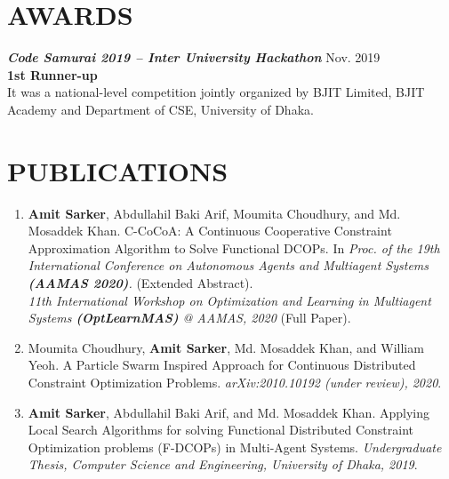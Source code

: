 \documentclass[margin, 10pt]{res} %
\makeatletter
\newlength{\bibhang}
\newlength{\bibsep}
 {\@listi \global\bibsep\itemsep \global\advance\bibsep by\parsep}
\newenvironment{bibsection}%
        {\begin{enumerate}{}{%
       \setlength{\leftmargin}{\bibhang}%
       \setlength{\itemindent}{-\leftmargin}%
       \setlength{\itemsep}{\bibsep}%
       \setlength{\parsep}{\z@}%
        \setlength{\partopsep}{0pt}%
        \setlength{\topsep}{0pt}}}
        {\end{enumerate}\vspace{-.6\baselineskip}}
\makeatother
\begin{document}
\begin{resume}




\section{AWARDS}

{\sl \bf{Code Samurai 2019 -- Inter University Hackathon} } \hfill Nov. 2019 \\ 
\textbf{1st Runner-up} \\
It was a national-level competition jointly organized by BJIT Limited, BJIT Academy and Department of CSE, University of Dhaka.


\section{PUBLICATIONS}
\begin{bibsection}
\item \textbf{Amit Sarker}, Abdullahil Baki Arif, Moumita Choudhury, and Md. Mosaddek Khan. C-CoCoA: A Continuous Cooperative Constraint Approximation Algorithm to Solve Functional DCOPs. In \emph{Proc. of the 19th International Conference on Autonomous Agents and Multiagent Systems \textbf{(AAMAS 2020)}.} (Extended Abstract). \\ 
\emph{11th International Workshop on Optimization and Learning in Multiagent Systems \textbf{(OptLearnMAS)} @ \mbox{AAMAS}, 2020} (Full Paper).

\item Moumita Choudhury, \textbf{Amit Sarker}, Md. Mosaddek Khan, and William Yeoh. A Particle Swarm Inspired Approach for Continuous Distributed Constraint Optimization Problems. \emph{arXiv:2010.10192  (under review), 2020}.

\item \textbf{Amit Sarker}, Abdullahil Baki Arif, and Md. Mosaddek Khan. Applying Local Search Algorithms for solving Functional Distributed Constraint Optimization problems
(F-DCOPs) in Multi-Agent Systems. \emph{Undergraduate Thesis, Computer Science and Engineering, University of Dhaka, 2019}.
\end{bibsection}




\end{resume}
\end{document}
